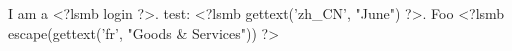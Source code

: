 \documentclass{scrartcl}
\begin{document}
I am a <?lsmb login ?>.
test: {\han <?lsmb gettext('zh_CN', "June") ?>.}
Foo
\rom <?lsmb escape(gettext('fr', "Goods & Services")) ?>
\end{document}
